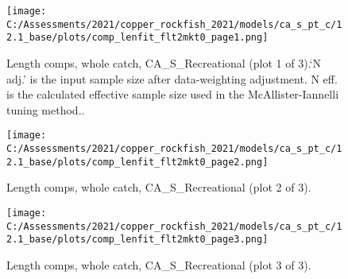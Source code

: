 \documentclass[11pt,
  english,
  a4paper,
]{article}
\begin{document}
\tagmcend\tagstructend


\begin{figure}
\centering
\texttt{[image: C:/Assessments/2021/copper\_rockfish\_2021/models/ca\_s\_pt\_c/12.1\_base/plots/comp\_lenfit\_flt2mkt0\_page1.png]}
\caption{Length comps, whole catch, CA\_S\_Recreational (plot 1 of 3).`N adj.' is the input sample size after data-weighting adjustment. N eff. is the calculated effective sample size used in the McAllister-Iannelli tuning method..\label{fig:comp_lenfit_flt2mkt0_page1}}
\end{figure}

\tagmcend\tagstructend


\begin{figure}
\centering
\texttt{[image: C:/Assessments/2021/copper\_rockfish\_2021/models/ca\_s\_pt\_c/12.1\_base/plots/comp\_lenfit\_flt2mkt0\_page2.png]}
\caption{Length comps, whole catch, CA\_S\_Recreational (plot 2 of 3).\label{fig:comp_lenfit_flt2mkt0_page2}}
\end{figure}

\tagmcend\tagstructend


\begin{figure}
\centering
\texttt{[image: C:/Assessments/2021/copper\_rockfish\_2021/models/ca\_s\_pt\_c/12.1\_base/plots/comp\_lenfit\_flt2mkt0\_page3.png]}
\caption{Length comps, whole catch, CA\_S\_Recreational (plot 3 of 3).\label{fig:comp_lenfit_flt2mkt0_page3}}
\end{figure}

\tagmcend\tagstructend

\end{document}
